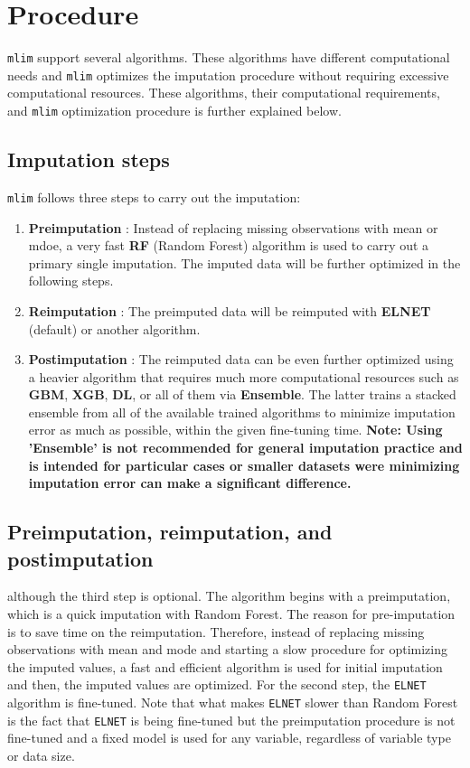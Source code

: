 \section{Procedure}

\texttt{mlim} support several algorithms. These algorithms have different computational needs and \texttt{mlim} optimizes the imputation procedure without requiring excessive computational resources. These algorithms, their computational requirements, and \texttt{mlim} optimization procedure is further explained below.

\subsection{Imputation steps}

\texttt{mlim} follows three steps to carry out the imputation:

\begin{enumerate}
    \item \textbf{Preimputation} : Instead of replacing missing observations with mean or mdoe, a very fast \textbf{RF} (Random Forest) algorithm is used to carry out a primary single imputation. The imputed data will be further optimized in the following steps.
    \item \textbf{Reimputation} : The preimputed data will be reimputed with \textbf{ELNET} (default) or another algorithm. 
    \item\textbf{Postimputation} : The reimputed data can be even further optimized using a heavier algorithm that requires much more computational resources such as \textbf{GBM}, \textbf{XGB}, \textbf{DL}, or all of them via \textbf{Ensemble}. The latter trains a stacked ensemble from all of the available trained algorithms to minimize imputation error as much as possible, within the given fine-tuning time. \textbf{\color{violet}Note: Using 'Ensemble' is not recommended for general imputation practice and is intended for particular cases or smaller datasets were minimizing imputation error can make a significant difference.}
\end{enumerate}

\subsection{Preimputation, reimputation, and postimputation}

although the third step is optional. The algorithm begins with a preimputation, which is a quick imputation with Random Forest. The reason for pre-imputation is to save time on the reimputation. Therefore, instead of replacing missing observations with mean and mode and starting a slow procedure for optimizing the imputed values, a fast and efficient algorithm is used for initial imputation and then, the imputed values are optimized. For the second step, the \texttt{ELNET} algorithm is fine-tuned. Note that what makes \texttt{ELNET} slower than Random Forest is the fact that \texttt{ELNET} is being fine-tuned but the preimputation procedure is not fine-tuned and a fixed model is used for any variable, regardless of variable type or data size. 

